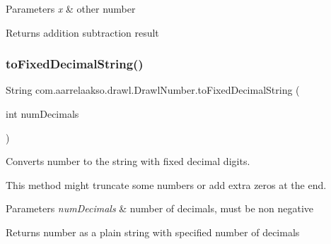 \begin{DoxyParams}{Parameters}
{\em x} & other number \\
\hline
\end{DoxyParams}
\begin{DoxyReturn}{Returns}
addition subtraction result 
\end{DoxyReturn}
\mbox{\label{classcom_1_1aarrelaakso_1_1drawl_1_1_drawl_number_abb3852d8cebda506fbcb18f9705522ff}} 
\subsubsection{\texorpdfstring{to\+Fixed\+Decimal\+String()}{toFixedDecimalString()}}
{\footnotesize\ttfamily String com.\+aarrelaakso.\+drawl.\+Drawl\+Number.\+to\+Fixed\+Decimal\+String (\begin{DoxyParamCaption}\item[{int}]{num\+Decimals }\end{DoxyParamCaption})\hspace{0.3cm}{\ttfamily [protected]}}



Converts number to the string with fixed decimal digits. 

This method might truncate some numbers or add extra zeros at the end.


\begin{DoxyParams}{Parameters}
{\em num\+Decimals} & number of decimals, must be non negative \\
\hline
\end{DoxyParams}
\begin{DoxyReturn}{Returns}
number as a plain string with specified number of decimals 
\end{DoxyReturn}
\mbox{\label{classcom_1_1aarrelaakso_1_1drawl_1_1_drawl_number_afa8d185aa5f961e7d54e62c96d788660}} 
